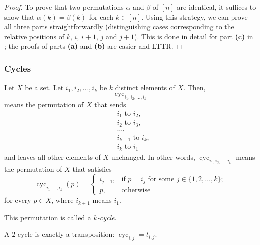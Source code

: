 \begin{proof}
To prove that two permutations $\alpha$ and $\beta$ of $[n]$ are identical,
it suffices to show that $\alpha(k) = \beta(k)$ for each $k \in [n]$.
Using this strategy, we can prove all three parts
straightforwardly (distinguishing cases corresponding to the relative
positions of $k$, $i$, $i+1$, $j$ and $j+1$). This is done in detail for
part \textbf{(c)} in \cite[solution to
Exercise 5.1 \textbf{(a)}]{detnotes}; the proofs of parts \textbf{(a)} and
\textbf{(b)} are easier and LTTR.
\end{proof}

\subsubsection{Cycles}

\begin{definition}
\label{def.perm.cycs}
\leantarget
\leanok
Let $X$ be a set. Let $i_1, i_2, \ldots, i_k$ be $k$ distinct elements of $X$.
Then,
\[
\operatorname{cyc}_{i_1, i_2, \ldots, i_k}
\]
means the permutation of $X$ that sends
\begin{align*}
&i_1 \text{ to } i_2, \\
&i_2 \text{ to } i_3, \\
&\ldots, \\
&i_{k-1} \text{ to } i_k, \\
&i_k \text{ to } i_1
\end{align*}
and leaves all other elements of $X$ unchanged. In other words,
$\operatorname{cyc}_{i_1, i_2, \ldots, i_k}$ means the
permutation of $X$ that satisfies
\[
\operatorname{cyc}_{i_1, \ldots, i_k}(p)
= \begin{cases}
i_{j+1}, & \text{if } p = i_j \text{ for some } j \in \{1, 2, \ldots, k\};\\
p, & \text{otherwise}
\end{cases}
\]
for every $p \in X$,
where $i_{k+1}$ means $i_1$.

This permutation is called a $k$\emph{-cycle}.
\end{definition}

\begin{lemma}
\label{lem.perm.cycs.pair}
\leanhelper
\leanok
A $2$-cycle is exactly a transposition: $\operatorname{cyc}_{i,j} = t_{i,j}$.
\end{lemma}

